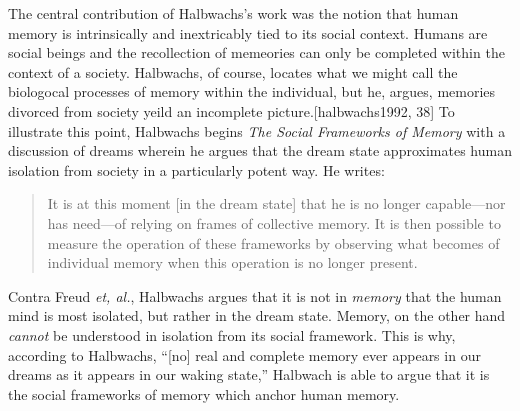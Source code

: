 The central contribution of Halbwachs's work was the notion that human
memory is intrinsically and inextricably tied to its social context.
Humans are social beings and the recollection of memeories can only be
completed within the context of a society. Halbwachs, of course, locates
what we might call the biologocal processes of memory within the
individual, but he, argues, memories divorced from society yeild an
incomplete picture.{[}halbwachs1992, 38{]} To illustrate this point,
Halbwachs begins \emph{The Social Frameworks of Memory} with a
discussion of dreams wherein he argues that the dream state approximates
human isolation from society in a particularly potent way. He writes:

\begin{quote}
It is at this moment {[}in the dream state{]} that he is no longer
capable---nor has need---of relying on frames of collective memory. It
is then possible to measure the operation of these frameworks by
observing what becomes of individual memory when this operation is no
longer present.\autocite[39]{halbwachs1992}
\end{quote}

Contra Freud \emph{et, al.}, Halbwachs argues that it is not in
\emph{memory} that the human mind is most isolated, but rather in the
dream state. Memory, on the other hand \emph{cannot} be understood in
isolation from its social framework. This is why, according to
Halbwachs, ``{[}no{]} real and complete memory ever appears in our
dreams as it appears in our waking state,''\autocite[41]{halbwachs1992}
Halbwach is able to argue that it is the social frameworks of memory
which anchor human memory.
